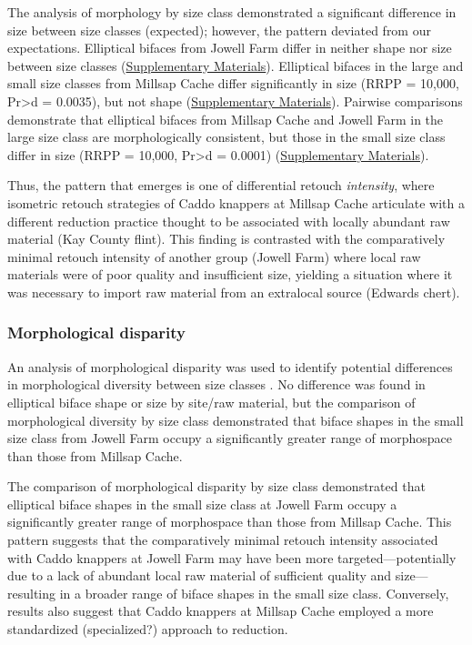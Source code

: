 \documentclass[]{interact}
\theoremstyle{plain}%
\theoremstyle{definition}
\theoremstyle{remark}
\begin{document}
The analysis of morphology by size class demonstrated a significant
difference in size between size classes (expected); however, the pattern
deviated from our expectations. Elliptical bifaces from Jowell Farm
differ in neither shape nor size between size classes
(\href{https://seldenlab.github.io/elliptical.bifaces/}{Supplementary
Materials}). Elliptical bifaces in the large and small size classes from
Millsap Cache differ significantly in size (RRPP = 10,000,
Pr\textgreater d = 0.0035), but not shape
(\href{https://seldenlab.github.io/elliptical.bifaces/}{Supplementary
Materials}). Pairwise comparisons demonstrate that elliptical bifaces
from Millsap Cache and Jowell Farm in the large size class are
morphologically consistent, but those in the small size class differ in
size (RRPP = 10,000, Pr\textgreater d = 0.0001)
(\href{https://seldenlab.github.io/elliptical.bifaces/}{Supplementary
Materials}).

Thus, the pattern that emerges is one of differential retouch
\emph{intensity}, where isometric retouch strategies of Caddo knappers
at Millsap Cache articulate with a different reduction practice thought
to be associated with locally abundant raw material (Kay County flint).
This finding is contrasted with the comparatively minimal retouch
intensity of another group (Jowell Farm) where local raw materials were
of poor quality and insufficient size, yielding a situation where it was
necessary to import raw material from an extralocal source (Edwards
chert).

\hypertarget{morphological-disparity}{%
\subsubsection{Morphological disparity}\label{morphological-disparity}}

An analysis of morphological disparity was used to identify potential
differences in morphological diversity between size classes
\citep{RN11107,RN7041,RN5694}. No difference was found in elliptical
biface shape or size by site/raw material, but the comparison of
morphological diversity by size class demonstrated that biface shapes in
the small size class from Jowell Farm occupy a significantly greater
range of morphospace than those from Millsap Cache.

The comparison of morphological disparity by size class demonstrated
that elliptical biface shapes in the small size class at Jowell Farm
occupy a significantly greater range of morphospace than those from
Millsap Cache. This pattern suggests that the comparatively minimal
retouch intensity associated with Caddo knappers at Jowell Farm may have
been more targeted---potentially due to a lack of abundant local raw
material of sufficient quality and size---resulting in a broader range
of biface shapes in the small size class. Conversely, results also
suggest that Caddo knappers at Millsap Cache employed a more
standardized (specialized?) approach to reduction.
\end{document}
